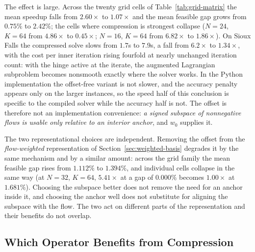 \documentclass[11pt]{article}
\newif\ifshownotes \shownotesfalse
\newcommand{\conote}[1]{\ifshownotes{\color{red}\small\textsf{[Note to co-authors: #1]}}\fi}
\begin{document}
The effect is large. Across the twenty grid cells of Table~\ref{tab:grid-matrix} the mean
speedup falls from $2.60\times$ to $1.07\times$ and the mean feasible gap grows from $0.75\%$
to $2.42\%$; the cells where compression is strongest collapse ($N=24$, $K=64$ from
$4.86\times$ to $0.45\times$; $N=16$, $K=64$ from $6.82\times$ to $1.86\times$). On Sioux
Falls the compressed solve slows from $1.7$s to $7.9$s, a fall from $6.2\times$ to
$1.34\times$, with the cost per inner iteration rising fourfold at nearly unchanged iteration
count: with the hinge active at the iterate, the augmented Lagrangian subproblem becomes
nonsmooth exactly where the solver works. In the Python implementation the offset-free
variant is not slower, and the accuracy penalty appears only on the larger instances, so the
speed half of this conclusion is specific to the compiled solver while the accuracy half is
not. The offset is therefore not an implementation convenience: \emph{a signed subspace of
nonnegative flows is usable only relative to an interior anchor}, and $w_0$ supplies it.

The two representational choices are independent. Removing the offset from the
\emph{flow-weighted} representation of Section~\ref{sec:weighted-basis} degrades it by the same
mechanism and by a similar amount: across the grid family the mean feasible gap rises from
$1.112\%$ to $1.394\%$, and individual cells collapse in the same way (at $N=32$, $K=64$,
$5.41\times$ at a gap of $0.000\%$ becomes $1.00\times$ at $1.681\%$). Choosing the subspace
better does not remove the need for an anchor inside it, and choosing the anchor well does not
substitute for aligning the subspace with the flow. The two act on different parts of the
representation and their benefits do not overlap.

\conote{This result cuts both ways and we should decide how to present it. It explains why the
representation works, but it also quantifies the dependence Referee~1 objected to: $w_0$ is
obtained by solving the full problem, and we have now proved the method needs it. The
strongest available answer is an experiment we have not run --- reuse a \emph{stale} $w_0$
from a perturbed instance and show the speedup survives. That single test would answer the
circularity objection, the preprocessing objection and the ``which application setting''
objection at once. Recommend we run it before resubmission.}


\subsection{Which Operator Benefits from Compression}
\label{sec:operator-study}
\end{document}
